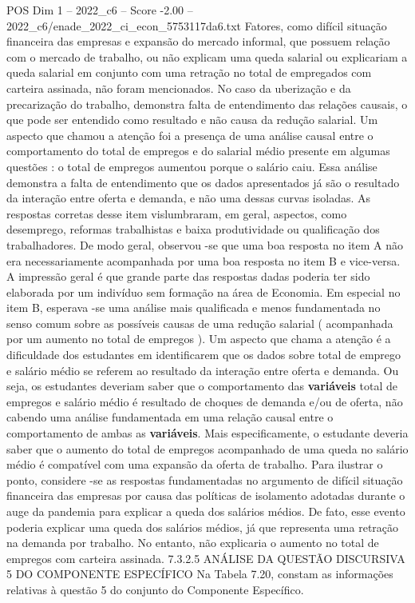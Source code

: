 \begin{textsample}{POS Dim 1 – 2022\_c6 – Score -2.00 – 2022\_c6/enade\_2022\_ci\_econ\_5753117da6.txt}
Fatores, como difícil situação financeira das empresas e expansão do mercado informal, que possuem relação com o mercado de trabalho, ou não explicam uma queda salarial ou explicariam a queda salarial em conjunto com uma retração no total de empregados com carteira assinada, não foram mencionados.
No caso da uberização e da precarização do trabalho, demonstra falta de entendimento das relações causais, o que pode ser entendido como resultado e não causa da redução salarial.
Um aspecto que chamou a atenção foi a presença de uma análise causal entre o comportamento do total de empregos e do salarial médio presente em algumas questões : o total de empregos aumentou porque o salário caiu.
Essa análise demonstra a falta de entendimento que os dados apresentados já são o resultado da interação entre oferta e demanda, e não uma dessas curvas isoladas.
As respostas corretas desse item vislumbraram, em geral, aspectos, como desemprego, reformas trabalhistas e baixa produtividade ou qualificação dos trabalhadores.
De modo geral, observou -se que uma boa resposta no item A não era necessariamente acompanhada por uma boa resposta no item B e vice-versa.
A impressão geral é que grande parte das respostas dadas poderia ter sido elaborada por um indivíduo sem formação na área de Economia.
Em especial no item B, esperava -se uma análise mais qualificada e menos fundamentada no senso comum sobre as possíveis causas de uma redução salarial ( acompanhada por um aumento no total de empregos ).
Um aspecto que chama a atenção é a dificuldade dos estudantes em identificarem que os dados sobre total de emprego e salário médio se referem ao resultado da interação entre oferta e demanda.
Ou seja, os estudantes deveriam saber que o comportamento das \textbf{variáveis} total de empregos e salário médio é resultado de choques de demanda e/ou de oferta, não cabendo uma análise fundamentada em uma relação causal entre o comportamento de ambas as \textbf{variáveis}.
Mais especificamente, o estudante deveria saber que o aumento do total de empregos acompanhado de uma queda no salário médio é compatível com uma expansão da oferta de trabalho.
Para ilustrar o ponto, considere -se as respostas fundamentadas no argumento de difícil situação financeira das empresas por causa das políticas de isolamento adotadas durante o auge da pandemia para explicar a queda dos salários médios.
De fato, esse evento poderia explicar uma queda dos salários médios, já que representa uma retração na demanda por trabalho.
No entanto, não explicaria o aumento no total de empregos com carteira assinada. 7.3.2.5 ANÁLISE DA QUESTÃO DISCURSIVA 5 DO COMPONENTE ESPECÍFICO Na Tabela 7.20, constam as informações relativas à questão 5 do conjunto do Componente Específico.

\end{textsample}
